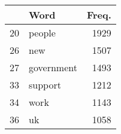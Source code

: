 \begin{table}[ht]
\centering
\begin{tabular}{rlr}
  \hline
 & Word & Freq. \\ 
  \hline
20 & people & 1929 \\ 
  26 & new & 1507 \\ 
  27 & government & 1493 \\ 
  33 & support & 1212 \\ 
  34 & work & 1143 \\ 
  36 & uk & 1058 \\ 
   \hline
\end{tabular}
\end{table}
